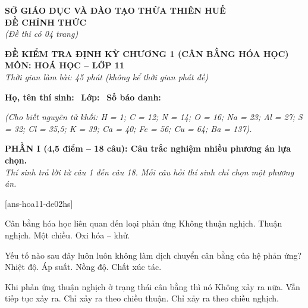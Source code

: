 \documentclass[12pt,a4paper]{article}
\begin{document}
\thispagestyle{firstpage}

\noindent
\begin{minipage}[t]{0.44\textwidth}
	\centering\fontsize{10pt}{12pt}\selectfont
	\textbf{SỞ GIÁO DỤC VÀ ĐÀO TẠO THỪA THIÊN HUẾ}\\
	\textbf{ĐỀ CHÍNH THỨC}\\
	\textit{(Đề thi có 04 trang)}
\end{minipage}\hfill
\begin{minipage}[t]{0.54\textwidth}
	\centering\small
	\textbf{ĐỀ KIỂM TRA ĐỊNH KỲ CHƯƠNG 1 (CÂN BẰNG HÓA HỌC)}\\
	\textbf{MÔN: HOÁ HỌC -- LỚP 11}\\
	\textit{Thời gian làm bài: 45 phút (không kể thời gian phát đề)}\\
\end{minipage}

\smallskip
\noindent\hrulefill
\smallskip

\noindent\textbf{Họ, tên thí sinh:} \dotfill\ \textbf{Lớp:} \dotfill\ \textbf{Số báo danh:} \dotfill

\smallskip
\noindent\textit{(Cho biết nguyên tử khối: H = 1; C = 12; N = 14; O = 16; Na = 23; Al = 27; S = 32; Cl = 35,5; K = 39; Ca = 40; Fe = 56; Cu = 64; Ba = 137).}
\smallskip

\noindent
\textbf{PHẦN I (4,5 điểm -- 18 câu): Câu trắc nghiệm nhiều phương án lựa chọn.}\\
\textit{Thí sinh trả lời từ câu 1 đến câu 18. Mỗi câu hỏi thí sinh chỉ chọn một phương án.}

[ans-hoa11-de02hs]

\begin{ex}
Cân bằng hóa học liên quan đến loại phản ứng
\choice
{Không thuận nghịch.}
{Thuận nghịch.}
{Một chiều.}
{Oxi hóa – khử.}
\loigiai{}
\end{ex}

\begin{ex}
Yếu tố nào sau đây luôn luôn không làm dịch chuyển cân bằng của hệ phản ứng?
\choice
{Nhiệt độ.}
{Áp suất.}
{Nồng độ.}
{Chất xúc tác.}
\loigiai{}
\end{ex}

\begin{ex}
Khi phản ứng thuận nghịch ở trạng thái cân bằng thì nó
\choice
{Không xảy ra nữa.}
{Vẫn tiếp tục xảy ra.}
{Chỉ xảy ra theo chiều thuận.}
{Chỉ xảy ra theo chiều nghịch.}
\loigiai{}
\end{ex}
\end{document}
